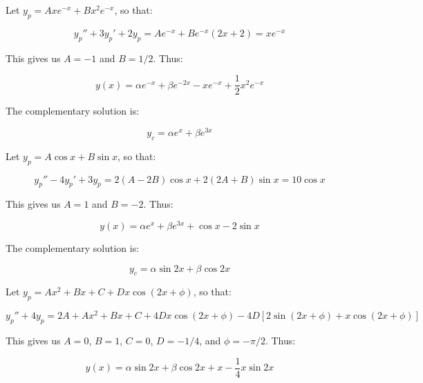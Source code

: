 \documentclass[12pt]{article}
\begin{document}
\begin{correction}
    Let $y_{p} = Axe^{-x} + Bx^{2}e^{-x}$, so that:

    \begin{equation}
        y_{p}'' + 3y_{p}' + 2y_{p} = Ae^{-x} + Be^{-x}(2x + 2) = xe^{-x}
    \end{equation}

    This gives us $A = -1$ and $B = 1/2$. Thus:

    \begin{equation}
        y(x) = \alpha e^{-x} + \beta e^{-2x} - xe^{-x} + \frac{1}{2} x^{2}e^{-x}
    \end{equation}
\end{correction}

The complementary solution is:

\begin{equation}
    y_{c} = \alpha e^{x} + \beta e^{3x}
\end{equation}

Let $y_{p} = A\cos{x} + B\sin{x}$, so that:

\begin{equation}
    y_{p}'' - 4y_{p}' + 3y_{p} = 2(A - 2B) \cos{x} + 2(2A + B)\sin{x} = 10\cos{x}
\end{equation}

This gives us $A = 1$ and $B = -2$. Thus:

\begin{equation}
    y(x) = \alpha e^{x} + \beta e^{3x} + \cos{x} - 2\sin{x}
\end{equation}

The complementary solution is:

\begin{equation}
    y_{c} = \alpha \sin{2x} + \beta \cos{2x}
\end{equation}

Let $y_{p} = Ax^{2} + Bx + C + Dx\cos{(2x + \phi)}$, so that:

\begin{equation}
    y_{p}'' + 4y_{p} = 2A + Ax^{2} + Bx + C + 4Dx\cos{(2x + \phi)} - 4D[2\sin{(2x + \phi)} + x\cos{(2x + \phi)}]
\end{equation}

This gives us $A = 0$, $B = 1$, $C = 0$, $D = -1/4$, and $\phi = -\pi/2$. Thus:

\begin{equation}
    y(x) = \alpha \sin{2x} + \beta \cos{2x} + x - \frac{1}{4}x\sin{2x}
\end{equation}
\end{document}
